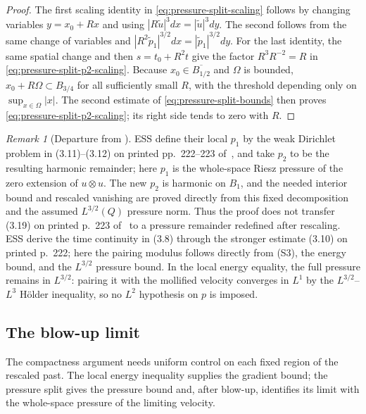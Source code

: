 \documentclass[11pt,letterpaper]{article}
\numberwithin{equation}{section}
\theoremstyle{plain}
\theoremstyle{definition}
\theoremstyle{remark}
\newtheorem{remark}[theorem]{Remark}
\begin{document}
\begin{proof}
The first scaling identity in \eqref{eq:pressure-split-scaling} follows by changing variables $y=x_0+Rx$ and using $|R\widetilde u|^3dx=|\widetilde u|^3dy$. The second follows from the same change of variables and $|R^2\widetilde p_1|^{3/2}dx=|\widetilde p_1|^{3/2}dy$. For the last identity, the same spatial change and then $s=t_0+R^2t$ give the factor $R^3R^{-2}=R$ in \eqref{eq:pressure-split-p2-scaling}. Because $x_0\in\overline{B_{1/2}}$ and $\Omega$ is bounded, $x_0+R\Omega\subset B_{3/4}$ for all sufficiently small $R$, with the threshold depending only on $\sup_{x\in\Omega}|x|$. The second estimate of \eqref{eq:pressure-split-bounds} then proves \eqref{eq:pressure-split-p2-scaling}; its right side tends to zero with $R$.
\end{proof}

\begin{remark}[Departure from \cite{ESS2003}]\label{rem:pb1-departure}
ESS define their local $p_1$ by the weak Dirichlet problem in (3.11)--(3.12) on printed pp.~222--223 of~\cite{ESS2003}, and take $p_2$ to be the resulting harmonic remainder; here $p_1$ is the whole-space Riesz pressure of the zero extension of $u\otimes u$. The new $p_2$ is harmonic on $B_1$, and the needed interior bound and rescaled vanishing are proved directly from this fixed decomposition and the assumed $L^{3/2}(Q)$ pressure norm. Thus the proof does not transfer (3.19) on printed p.~223 of~\cite{ESS2003} to a pressure remainder redefined after rescaling. ESS derive the time continuity in (3.8) through the stronger estimate (3.10) on printed p.~222; here the pairing modulus follows directly from (S3), the energy bound, and the $L^{3/2}$ pressure bound. In the local energy equality, the full pressure remains in $L^{3/2}$: pairing it with the mollified velocity converges in $L^1$ by the $L^{3/2}$--$L^3$ H\"older inequality, so no $L^2$ hypothesis on $p$ is imposed.
\end{remark}

\subsection{The blow-up limit}\label{subsec:blowup-limit}

The compactness argument needs uniform control on each fixed region of the rescaled past. The local energy inequality supplies the gradient bound; the pressure split gives the pressure bound and, after blow-up, identifies its limit with the whole-space pressure of the limiting velocity.
\end{document}
